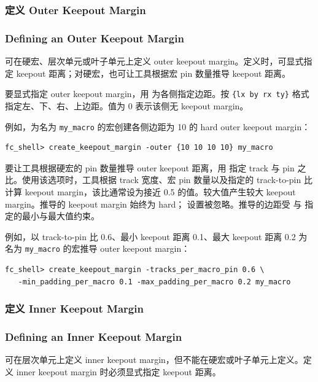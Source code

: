 \subsubsection{定义 Outer Keepout Margin}
\subsubsection*{Defining an Outer Keepout Margin}

可在硬宏、层次单元或叶子单元上定义 outer keepout margin。定义时，可显式指定 keepout 距离；对硬宏，也可让工具根据宏 pin 数量推导 keepout 距离。

要显式指定 outer keepout margin，用  为各侧指定边距。按 \texttt{\{lx by rx ty\}} 格式指定左、下、右、上边距。值为 0 表示该侧无 keepout margin。

例如，为名为 \texttt{my\_macro} 的宏创建各侧边距为 10 的 hard outer keepout margin：
\begin{lstlisting}
fc_shell> create_keepout_margin -outer {10 10 10 10} my_macro
\end{lstlisting}

要让工具根据硬宏的 pin 数量推导 outer keepout 距离，用  指定 track 与 pin 之比。使用该选项时，工具根据 track 宽度、宏 pin 数量以及指定的 track-to-pin 比计算 keepout margin，该比通常设为接近 0.5 的值。较大值产生较大 keepout margin。推导的 keepout margin 始终为 hard； 设置被忽略。推导的边距受  与  指定的最小与最大值约束。

例如，以 track-to-pin 比 0.6、最小 keepout 距离 0.1、最大 keepout 距离 0.2 为名为 \texttt{my\_macro} 的宏推导 outer keepout margin：
\begin{lstlisting}
fc_shell> create_keepout_margin -tracks_per_macro_pin 0.6 \
   -min_padding_per_macro 0.1 -max_padding_per_macro 0.2 my_macro
\end{lstlisting}

\subsubsection{定义 Inner Keepout Margin}
\subsubsection*{Defining an Inner Keepout Margin}

可在层次单元上定义 inner keepout margin，但不能在硬宏或叶子单元上定义。定义 inner keepout margin 时必须显式指定 keepout 距离。

